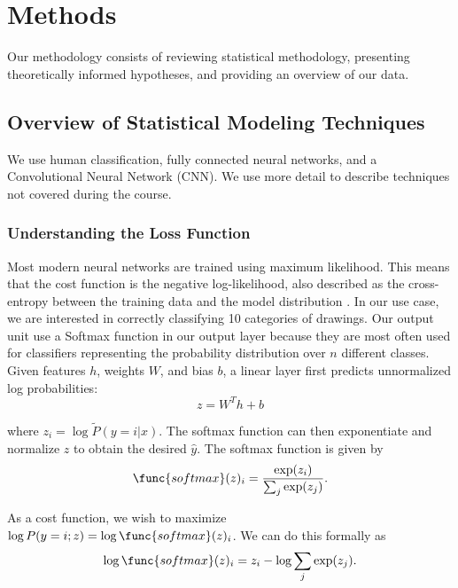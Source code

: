 \documentclass[11pt]{article}
\begin{document}
\section{Methods}

Our methodology consists of reviewing statistical methodology, presenting
theoretically informed hypotheses, and providing an overview of our data.

\subsection{Overview of Statistical Modeling Techniques}

We use human classification, fully connected neural networks,
and a Convolutional Neural Network (CNN). We use more detail to
describe techniques not covered during the course.

\subsubsection{Understanding the Loss Function}

Most modern neural networks are trained using maximum likelihood. This
means that the cost function is the negative log-likelihood, also
described as the cross-entropy between the training data and the model
distribution \cite{Goodfellow-et-al-2016}. In our use case, we are interested
in correctly classifying 10 categories of drawings. Our output unit
use a Softmax function in our output layer because they are most often
used for classifiers representing the probability distribution over
$n$ different classes. Given features $h$, weights $W$, and bias $b$, a
linear layer first predicts unnormalized log probabilities:
\begin{equation}
  z = W^Th + b 
\end{equation}

where $z_i = \log \tilde{P}(y = i | x)$. The softmax function can then
exponentiate and normalize $z$ to obtain the desired $\hat{y}$. The
softmax function is given by
\begin{equation}
  \func{softmax}(z)_i = \frac{\exp(z_i)}{\sum_j \exp(z_j)}.
\end{equation}

As a cost function, we wish to maximize
$\log P(y=i; z) = \log \func{softmax}(z)_i$. We can do this formally as
\begin{equation}
  \log \func{softmax}(z)_i = z_i - \log \sum_j \exp(z_j).
\end{equation}
\end{document}
